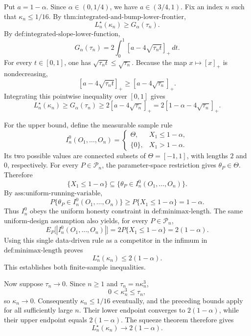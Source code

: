 Put \(a=1-\alpha\).  Since \(\alpha\in(0,1/4)\), we have
\(a\in(3/4,1)\).  Fix an index \(n\) such that
\(\kappa_n\le 1/16\).  By
\(\text{thm:integrated-and-bump-lower-frontier}\),
\[
 L_n^\star(\kappa_n)\ge G_\alpha(\tau_n).
\]
By \(\text{def:integrated-slope-lower-function}\),
\[
 G_\alpha(\tau_n)
 =2\int_0^1 [a-4\sqrt{\tau_n t}]_+\,dt.
\]
For every \(t\in[0,1]\), one has
\(\sqrt{\tau_n t}\le \sqrt{\tau_n}\).  Because the map
\(x\mapsto[x]_+\) is nondecreasing,
\[
 [a-4\sqrt{\tau_n t}]_+
 \ge [a-4\sqrt{\tau_n}]_+.
\]
Integrating this pointwise inequality over \([0,1]\) gives
\[
 L_n^\star(\kappa_n)
 \ge G_\alpha(\tau_n)
 \ge 2[a-4\sqrt{\tau_n}]_+
 =2[1-\alpha-4\sqrt{\tau_n}]_+.
\]

For the upper bound, define the measurable sample rule
\[
 I_n^0(O_1,\ldots,O_n)
 =
 \begin{cases}
   \Theta,& X_1\le 1-\alpha,\\
   \{0\},& X_1>1-\alpha.
 \end{cases}
\]
Its two possible values are connected subsets of
\(\Theta=[-1,1]\), with lengths \(2\) and \(0\), respectively.
For every \(P\in\mathcal P_n\), the parameter-space restriction gives
\(\theta_P\in\Theta\).  Therefore
\[
 \{X_1\le1-\alpha\}
 \subseteq
 \{\theta_P\in I_n^0(O_1,\ldots,O_n)\}.
\]
By \(\text{ass:uniform-running-variable}\),
\[
 P\{\theta_P\in I_n^0(O_1,\ldots,O_n)\}
 \ge P\{X_1\le1-\alpha\}
 =1-\alpha.
\]
Thus \(I_n^0\) obeys the uniform honesty constraint in
\(\text{def:minimax-length}\).  The same uniform-design assumption
also yields, for every \(P\in\mathcal P_n\),
\[
 E_P\bigl[|I_n^0(O_1,\ldots,O_n)|\bigr]
 =2P\{X_1\le1-\alpha\}
 =2(1-\alpha).
\]
Using this single data-driven rule as a competitor in the infimum in
\(\text{def:minimax-length}\) proves
\[
 L_n^\star(\kappa_n)\le2(1-\alpha).
\]
This establishes both finite-sample inequalities.

Now suppose \(\tau_n\to0\).  Since \(n\ge1\) and
\(\tau_n=n\kappa_n^3\),
\[
 0<\kappa_n^3\le\tau_n,
\]
so \(\kappa_n\to0\).  Consequently \(\kappa_n\le1/16\)
eventually, and the preceding bounds apply for all sufficiently large
\(n\).  Their lower endpoint converges to \(2(1-\alpha)\), while their
upper endpoint equals \(2(1-\alpha)\).  The squeeze theorem therefore
gives
\[
 L_n^\star(\kappa_n)\longrightarrow2(1-\alpha).
\]

